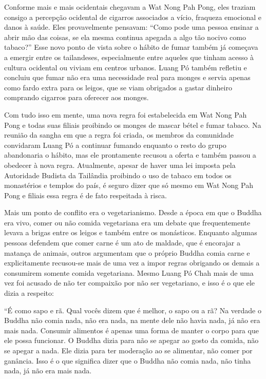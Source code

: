 Conforme mais e mais ocidentais chegavam a Wat Nong Pah Pong, eles
traziam consigo a percepção ocidental de cigarros associados a vício,
fraqueza emocional e danos à saúde. Eles provavelmente pensavam: ``Como
pode uma pessoa ensinar a abrir mão das coisas, se ela mesma continua
apegada a algo tão nocivo como tabaco?'' Esse novo ponto de vista sobre
o hábito de fumar também já começava a emergir entre os tailandeses,
especialmente entre aqueles que tinham acesso à cultura ocidental ou
viviam em centros urbanos. Luang Pó também refletiu e concluiu que fumar
não era uma necessidade real para monges e servia apenas como fardo
extra para os leigos, que se viam obrigados a gastar dinheiro comprando
cigarros para oferecer aos monges.

Com tudo isso em mente, uma nova regra foi estabelecida em Wat Nong Pah
Pong e todas suas filiais proibindo os monges de mascar bétel e fumar
tabaco. Na reunião da sangha em que a regra foi criada, os membros da
comunidade convidaram Luang Pó a continuar fumando enquanto o resto do
grupo abandonaria o hábito, mas ele prontamente recusou a oferta e
também passou a obedecer à nova regra. Atualmente, apesar de haver uma
lei imposta pela Autoridade Budista da Tailândia proibindo o uso de
tabaco em todos os monastérios e templos do país, é seguro dizer que só
mesmo em Wat Nong Pah Pong e filiais essa regra é de fato respeitada à
risca.

Mais um ponto de conflito era o vegetarianismo. Desde a época em que o
Buddha era vivo, comer ou não comida vegetariana era um debate que
frequentemente levava a brigas entre os leigos e também entre os
monásticos. Enquanto algumas pessoas defendem que comer carne é um ato
de maldade, que é encorajar a matança de animais, outros argumentam que
o próprio Buddha comia carne e explicitamente recusou-se mais de uma vez
a impor regras obrigando os demais a consumirem somente comida
vegetariana. Mesmo Luang Pó Chah mais de uma vez foi acusado de não ter
compaixão por não ser vegetariano, e isso é o que ele dizia a respeito:

``É como sapo e rã. Qual vocês dizem que é melhor, o sapo ou a rã? Na
verdade o Buddha não comia nada, não era nada, na mente dele não havia
nada, já não era mais nada. Consumir alimentos é apenas uma forma de
manter o corpo para que ele possa funcionar. O Buddha dizia para não se
apegar ao gosto da comida, não se apegar a nada. Ele dizia para ter
moderação ao se alimentar, não comer por ganância. Isso é o que
significa dizer que o Buddha não comia nada, não tinha nada, já não era
mais nada.


